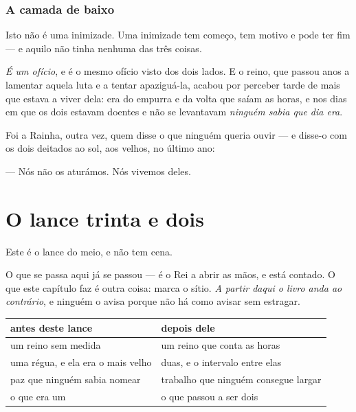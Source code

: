 \documentclass[livro.tex]{subfiles}
\begin{document}
\subsection*{A camada de baixo}

Isto não é uma inimizade. Uma inimizade tem começo, tem motivo e pode ter fim --- e aquilo não
tinha nenhuma das três coisas.

\medskip

\emph{É um ofício}, e é o mesmo ofício visto dos dois lados. E o reino, que passou anos a
lamentar aquela luta e a tentar apaziguá-la, acabou por perceber tarde de mais que estava a viver
dela: era do empurra e da volta que saíam as horas, e nos dias em que os dois estavam doentes e
não se levantavam \emph{ninguém sabia que dia era}.

\medskip

Foi a Rainha, outra vez, quem disse o que ninguém queria ouvir --- e disse-o com os dois deitados
ao sol, aos velhos, no último ano:

\medskip

--- Nós não os aturámos. Nós vivemos deles.



\chapter{O lance trinta e dois}

Este é o lance do meio, e não tem cena.

\medskip

O que se passa aqui já se passou --- é o Rei a abrir as mãos, e está contado. O que este capítulo
faz é outra coisa: marca o sítio. \emph{A partir daqui o livro anda ao contrário}, e ninguém o
avisa porque não há como avisar sem estragar.

\begin{center}\small
\begin{tabular}{@{}ll@{}}
\toprule
\textbf{antes deste lance} & \textbf{depois dele} \\
\midrule
um reino sem medida & um reino que conta as horas \\
uma régua, e ela era o mais velho & duas, e o intervalo entre elas \\
paz que ninguém sabia nomear & trabalho que ninguém consegue largar \\
o que era um & o que passou a ser dois \\
\bottomrule
\end{tabular}
\end{center}
\end{document}
